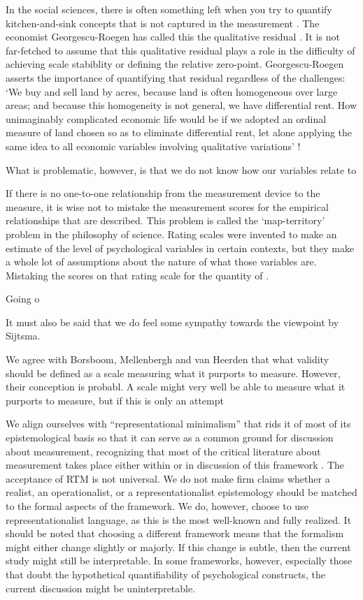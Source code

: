 \documentclass[utf8]{FrontiersinVancouver}
\begin{document}
In the social sciences, there is often something left when you try to quantify kitchen-and-sink concepts that is not captured in the measurement \citep{}. The economist Georgescu-Roegen has called this the qualitative residual \citep{georgescu-roegenMeasureQualityOptimum1965}. It is not far-fetched to assume that this qualitative residual plays a role in the difficulty of achieving scale stabiblity or defining the relative zero-point. Georgescu-Roegen asserts the importance of quantifying that residual regardless of the challenges: `We buy and sell land by acres, because land is often homogeneous over large areas; and because this homogeneity is not general, we have differential rent. How unimaginably complicated economic life would be if we adopted an ordinal measure of land chosen so as to eliminate differential rent, let alone applying the same idea to all economic variables involving qualitative variations' \citep{georgescu-roegenMeasureQualityOptimum1965}!


What is problematic, however, is that we do not know how our variables relate to 


If there is no one-to-one relationship from the measurement device to the measure, it is wise not to mistake the measurement scores for the empirical relationships that are described. This problem is called the `map-territory' problem in the philosophy of science. Rating scales were invented to make an estimate of the level of psychological variables in certain contexts, but they make a whole lot of assumptions about the nature of what those variables are. Mistaking the scores on that rating scale for the quantity of . 

Going o

It must also be said that we do feel some sympathy towards the viewpoint by Sijtsma\citep{sijtsmaPsychologicalMeasurementPhysics2012}. 

We agree with Borsboom, Mellenbergh and van Heerden that what validity should be defined as a scale measuring what it purports to measure. However, their conception is probabl. A scale might very well be able to measure what it purports to measure, but if this is only an attempt 

We align ourselves with ``representational minimalism'' that rids it of most of its epistemological basis so that it can serve as a common ground for discussion about measurement, recognizing that most of the critical literature about measurement takes place either within or in discussion of this framework \citep{vessonenRepresentationMeasurement2021}. The acceptance of RTM is not universal. We do not make firm claims whether a realist, an operationalist, or a representationalist epistemology should be matched to the formal aspects of the framework. We do, however, choose to use representationalist language, as this is the most well-known and fully realized. It should be noted that choosing a different framework means that the formalism might either change slightly or majorly. If this change is subtle, then the current study might still be interpretable. In some frameworks, however, especially those that doubt the hypothetical quantifiability of psychological constructs, the current discussion might be uninterpretable.
\end{document}
